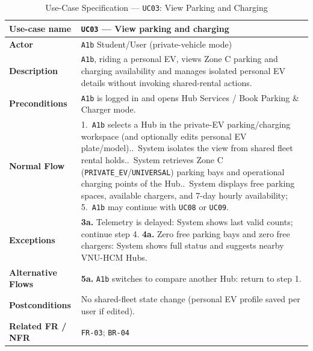 \begin{table}[H]
  \centering
  \singlespacing\footnotesize
  \caption{Use-Case Specification --- \texttt{UC03}: View Parking and Charging}
  \label{tab:uc03}
  \renewcommand{\arraystretch}{1.13}
  \begin{tabularx}{\textwidth}{|L{2.9cm}|Y|}
    \hline
    \textbf{Use-case name} & \textbf{\texttt{UC03} --- View parking and charging} \\
    \hline
    \textbf{Actor} & \texttt{A1b} Student/User (private-vehicle mode) \\
    \hline
    \textbf{Description} & \texttt{A1b}, riding a personal EV, views Zone C parking and charging availability and manages isolated personal EV details without invoking shared-rental actions. \\
    \hline
    \textbf{Preconditions} & \texttt{A1b} is logged in and opens Hub Services / Book Parking \& Charger mode. \\
    \hline
    \textbf{Normal Flow} & 1.\ \texttt{A1b} selects a Hub in the private-EV parking/charging workspace (and optionally edits personal EV plate/model)..\ System isolates the view from shared fleet rental holds..\ System retrieves Zone C (\texttt{PRIVATE\_\allowbreak EV}/\texttt{UNIVERSAL}) parking bays and operational charging points of the Hub..\ System displays free parking spaces, available chargers, and 7-day hourly availability; 5.\ \texttt{A1b} may continue with \texttt{UC08} or \texttt{UC09}. \\
    \hline
    \textbf{Exceptions} & \textbf{3a.} Telemetry is delayed: System shows last valid counts; continue step 4.\newline
    \textbf{4a.} Zero free parking bays and zero free chargers: System shows full status and suggests nearby VNU-HCM Hubs. \\
    \hline
    \textbf{Alternative Flows} & \textbf{5a.} \texttt{A1b} switches to compare another Hub: return to step 1. \\
    \hline
    \textbf{Postconditions} & No shared-fleet state change (personal EV profile saved per user if edited). \\
    \hline
    \textbf{Related FR / NFR} & \texttt{FR-03}; \texttt{BR-04} \\
    \hline
  \end{tabularx}
\end{table}

